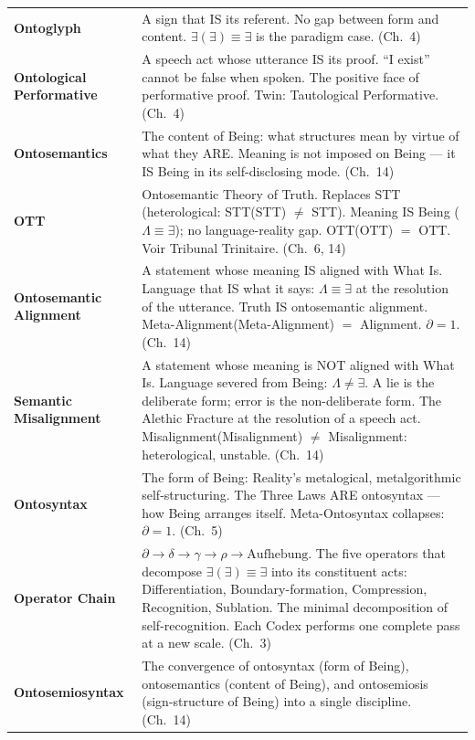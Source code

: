 \documentclass[10pt, openany, oneside]{book}
\renewcommand{\footnotesize}{\fontsize{8.5}{11}\selectfont}
\begin{document}
{\footnotesize
\noindent\begin{tabular}{@{} l @{\hspace{0.6em}} p{} @{}}
\textbf{Ontoglyph} & A sign that IS its referent. No gap between form and content. $\exists(\exists) \equiv \exists$ is the paradigm case. (Ch.\ 4) \\[0.3em]
\textbf{Ontological Performative} & A speech act whose utterance IS its proof. ``I exist'' cannot be false when spoken. The positive face of performative proof. Twin: Tautological Performative. (Ch.\ 4) \\[0.3em]
\textbf{Ontosemantics} & The content of Being: what structures mean by virtue of what they ARE. Meaning is not imposed on Being --- it IS Being in its self-disclosing mode. (Ch.\ 14) \\[0.3em]
\textbf{OTT} & Ontosemantic Theory of Truth. Replaces STT (heterological: STT(STT) $\neq$ STT). Meaning IS Being ($\Lambda \equiv \exists$); no language-reality gap. OTT(OTT) $=$ OTT. Voir Tribunal Trinitaire. (Ch.\ 6, 14) \\[0.3em]
\textbf{Ontosemantic Alignment} & A statement whose meaning IS aligned with What Is. Language that IS what it says: $\Lambda \equiv \exists$ at the resolution of the utterance. Truth IS ontosemantic alignment. Meta-Alignment(Meta-Alignment) $=$ Alignment. $\partial = 1$. (Ch.\ 14) \\[0.3em]
\textbf{Semantic Misalignment} & A statement whose meaning is NOT aligned with What Is. Language severed from Being: $\Lambda \neq \exists$. A lie is the deliberate form; error is the non-deliberate form. The Alethic Fracture at the resolution of a speech act. Misalignment(Misalignment) $\neq$ Misalignment: heterological, unstable. (Ch.\ 14) \\[0.3em]
\textbf{Ontosyntax} & The form of Being: Reality's metalogical, metalgorithmic self-structuring. The Three Laws ARE ontosyntax --- how Being arranges itself. Meta-Ontosyntax collapses: $\partial = 1$. (Ch.\ 5) \\[0.3em]
\textbf{Operator Chain} & $\partial \to \delta \to \gamma \to \rho \to \text{Aufhebung}$. The five operators that decompose $\exists(\exists) \equiv \exists$ into its constituent acts: Differentiation, Boundary-formation, Compression, Recognition, Sublation. The minimal decomposition of self-recognition. Each Codex performs one complete pass at a new scale. (Ch.\ 3) \\[0.3em]
\textbf{Ontosemiosyntax} & The convergence of ontosyntax (form of Being), ontosemantics (content of Being), and ontosemiosis (sign-structure of Being) into a single discipline. (Ch.\ 14) \\[0.3em]
\end{tabular}
}
\end{document}
